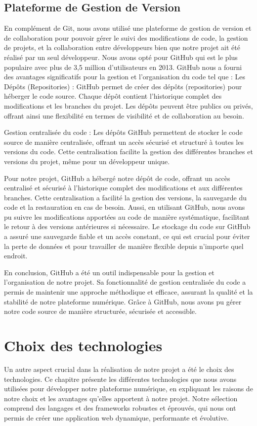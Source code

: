 \subsection{Plateforme de Gestion de Version}
En complément de Git, nous avons utilisé une plateforme de gestion de version et de collaboration pour pouvoir gérer le suivi des modifications de code, la gestion de projets, et la collaboration entre développeurs bien que notre projet ait été réalisé par un seul développeur. Nous avons opté pour GitHub qui est le plus populaire avec plus de 3,5 million d'utilisateurs \cite{lima2014coding} en 2013.
GitHub nous a fourni des avantages significatifs pour la gestion et l'organisation du code tel que :
Les Dépôts (Repositories) : GitHub permet de créer des dépôts (repositories) pour héberger le code source. Chaque dépôt contient l'historique complet des modifications et les branches du projet. Les dépôts peuvent être publics ou privés, offrant ainsi une flexibilité en termes de visibilité et de collaboration au besoin. \par
Gestion centralisée du code : Les dépôts GitHub permettent de stocker le code source de manière centralisée, offrant un accès sécurisé et structuré à toutes les versions du code. Cette centralisation facilite la gestion des différentes branches et versions du projet, même pour un développeur unique.
\par Pour notre projet, GitHub a hébergé notre dépôt de code, offrant un accès centralisé et sécurisé à l'historique complet des modifications et aux différentes branches. Cette centralisation a facilité la gestion des versions, la sauvegarde du code et la restauration en cas de besoin. Aussi, en utilisant GitHub, nous avons pu suivre les modifications apportées au code de manière systématique, facilitant le retour à des versions antérieures si nécessaire. Le stockage du code sur GitHub a assuré une sauvegarde fiable et un accès constant, ce qui est crucial pour éviter la perte de données et pour travailler de manière flexible depuis n'importe quel endroit. 
\par
En conclusion, GitHub a été un outil indispensable pour la gestion et l'organisation de notre projet. Sa fonctionnalité de gestion centralisée du code a permis de maintenir une approche méthodique et efficace, assurant la qualité et la stabilité de notre plateforme numérique. Grâce à GitHub, nous avons pu gérer notre code source de manière structurée, sécurisée et accessible.

\section{Choix des technologies}
Un autre aspect crucial dans la réalisation de notre projet a été le choix des technologies. Ce chapitre présente les différentes technologies que nous avons utilisées pour développer notre plateforme numérique, en expliquant les raisons de notre choix et les avantages qu'elles apportent à notre projet. Notre sélection comprend des langages et des frameworks robustes et éprouvés, qui nous ont permis de créer une application web dynamique, performante et évolutive.